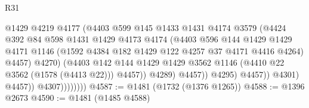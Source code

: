 \begin{lexlean}{R31}
\begin{coremodule}
                                      @1429
                                      @4219
                                      @4177
                                      (@4403
                                        @599
                                        @145
                                        @1433
                                        @1431
                                        @4174
                                        @3579
                                        (@4424
                                          @392
                                          @84
                                          @598
                                          @1431
                                          @1429
                                          @4173
                                          @4174
                                          (@4403
                                            @596
                                            @144
                                            @1429
                                            @1429
                                            @4171
                                            @1146
                                            (@1592
                                              @4384
                                              @182
                                              @1429
                                              @122
                                              @4257
                                              @37
                                              @4171
                                              @4416
                                              @4264)
                                            @4457)
                                          @4270)
                                        (@4403
                                          @142
                                          @144
                                          @1429
                                          @1429
                                          @3562
                                          @1146
                                          (@4410 @22 @3562 (@1578 (@4413 @22)))
                                          @4457))
                                      @4289)
                                    @4457))
                                @4295)
                              @4457))
                          @4301)
                        @4457))
                    @4307))))))))
@4587 := @1481 (@1732 (@1376 @1265))
@4588 := @1396 @2673
@4590 := @1481 (@1485 @4588)

\end{coremodule}
\end{lexlean}
